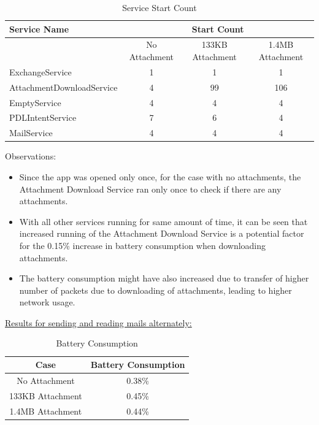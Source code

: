 \documentclass[a4paper,12pt]{article}
\begin{document}
\begin{table}[!h]
\centering
\caption{Service Start Count}
\label{my-label}
\begin{tabular}{|l|c|c|c|}
\hline
Service Name              & \multicolumn{3}{c|}{Start Count}                    \\ \hline
                          & No Attachment & 133KB Attachment & 1.4MB Attachment \\ \hline
ExchangeService           & 1             & 1                & 1                \\ \hline
AttachmentDownloadService & 4             & 99               & 106              \\ \hline
EmptyService              & 4             & 4                & 4                \\ \hline
PDLIntentService          & 7             & 6                & 4                \\ \hline
MailService               & 4             & 4                & 4                \\ \hline
\end{tabular}
\end{table}
\pagebreak
Observations: 
\begin{itemize}
	\item Since the app was opened only once, for the case with no attachments, the Attachment Download Service ran only once to check if there are any attachments. 
	\item With all other services running for same amount of time, it can be seen that increased running of the Attachment Download Service is a potential factor for the 0.15\% increase in battery consumption when downloading attachments. 
	\item The battery consumption might have also increased due to transfer of higher number of packets due to downloading of attachments, leading to higher network usage.
\end{itemize}
\underline{Results for sending and reading mails alternately: }\\
\begin{table}[!h]
\centering
\caption{Battery Consumption}
\begin{tabular}{|c|c|}
\hline
Case & Battery Consumption\\ \hline
No Attachment & 0.38\%\\ \hline
133KB Attachment & 0.45\% \\ \hline
1.4MB Attachment & 0.44\% \\ \hline 
\end{tabular}
\end{table}
\end{document}
